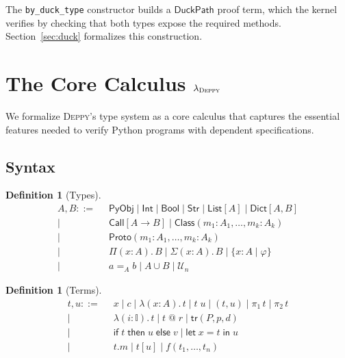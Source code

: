\documentclass[acmsmall,nonacm,screen]{acmart}
\newtheorem{definition}[theorem]{Definition}
\newcommand{\deppy}{\textsc{Deppy}}
\newcommand{\syntype}[1]{\ensuremath{\mathsf{#1}}}
\newcommand{\pyobj}{\syntype{PyObj}}
\newcommand{\pyint}{\syntype{Int}}
\newcommand{\pybool}{\syntype{Bool}}
\newcommand{\pystr}{\syntype{Str}}
\newcommand{\pylist}[1]{\syntype{List}[#1]}
\newcommand{\pydict}[2]{\syntype{Dict}[#1,#2]}
\newcommand{\pycall}[2]{\syntype{Call}[#1 \to #2]}
\newcommand{\pyclass}[1]{\syntype{Class}(#1)}
\newcommand{\pyproto}[1]{\syntype{Proto}(#1)}
\newcommand{\pitype}[3]{\Pi(#1 : #2).\,#3}
\newcommand{\sigtype}[3]{\Sigma(#1 : #2).\,#3}
\newcommand{\pathtype}[3]{#2 =_{#1} #3}
\newcommand{\reftype}[3]{\{#1 : #2 \mid #3\}}
\newcommand{\interval}{\mathbb{I}}
\newcommand{\universe}{\mathcal{U}}
\newcommand{\transport}[3]{\syntype{tr}(#1, #2, #3)}
\newcommand{\duckpath}{\ensuremath{\syntype{DuckPath}}}
\begin{document}
The \texttt{by\_duck\_type} constructor builds a \duckpath{} proof
term, which the kernel verifies by checking that both types expose the
required methods.  Section~\ref{sec:duck} formalizes this construction.



\section{The Core Calculus $\lambda_{\deppy}$}\label{sec:calculus}

We formalize \deppy{}'s type system as a core calculus that captures
the essential features needed to verify Python programs with dependent
specifications.

\subsection{Syntax}

\begin{definition}[Types]
\begin{align*}
A, B ::=\;\; & \pyobj \mid \pyint \mid \pybool \mid \pystr
  \mid \pylist{A} \mid \pydict{A}{B} \\
  \mid\;\; & \pycall{A}{B} \mid \pyclass{m_1 : A_1, \ldots, m_k : A_k} \\
  \mid\;\; & \pyproto{m_1 : A_1, \ldots, m_k : A_k} \\
  \mid\;\; & \pitype{x}{A}{B} \mid \sigtype{x}{A}{B}
  \mid \reftype{x}{A}{\varphi} \\
  \mid\;\; & \pathtype{A}{a}{b}
  \mid A \cup B \mid \universe_n
\end{align*}
\end{definition}

\begin{definition}[Terms]
\begin{align*}
t, u ::=\;\; & x \mid c \mid \lambda(x : A).\,t \mid t\;u
  \mid (t, u) \mid \pi_1\,t \mid \pi_2\,t \\
  \mid\;\; & \lambda(i : \interval).\,t \mid t\;@\;r
  \mid \transport{P}{p}{d} \\
  \mid\;\; & \mathsf{if}\;t\;\mathsf{then}\;u\;\mathsf{else}\;v
  \mid \mathsf{let}\;x = t\;\mathsf{in}\;u \\
  \mid\;\; & t.m \mid t[u] \mid f(t_1, \ldots, t_n)
\end{align*}
\end{definition}
\end{document}
